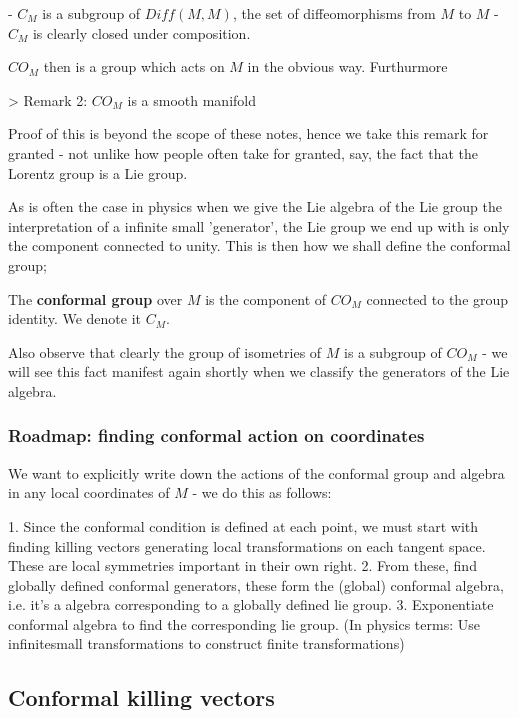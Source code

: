 - $C_M$ is a subgroup of $Diff(M, M)$, the set of diffeomorphisms from $M$ to $M$
- $C_M$ is clearly closed under composition.


$CO_M$ then is a group which acts on $M$ in the obvious way. Furthurmore

> Remark 2:  $CO_M$ is a smooth manifold

Proof of this is beyond the scope of these notes, hence we take this remark for granted - not unlike how people often take for granted, say, the fact that the Lorentz group is a Lie group. 

As is often the case in physics when we give the Lie algebra of the Lie group the interpretation of a infinite small 'generator', the Lie group we end up with is only the component connected to unity. This is then how we shall define the conformal group;

\begin{defn}
The \textbf{conformal group} over $M$ is the component of $CO_M$ connected to the group identity. We denote it $C_M$.
\end{defn}

Also observe that clearly the group of isometries of $M$ is a subgroup of $CO_M$ - we will see this fact manifest again shortly when we classify the generators of the Lie algebra.

\subsubsection{ Roadmap: finding conformal action on coordinates}

We want to explicitly write down the actions of the conformal group and algebra in any local coordinates of $M$ - we do this as follows:

1. Since the conformal condition is defined at each point, we must start with finding killing vectors generating local transformations on each tangent space. These are local symmetries important in their own right.
2. From these, find globally defined conformal generators, these form the (global) conformal algebra, i.e. it's a algebra corresponding to a globally defined lie group.
3. Exponentiate conformal algebra to find the corresponding lie group. (In physics terms: Use infinitesmall transformations to construct finite transformations)

\subsection{ Conformal killing vectors}


